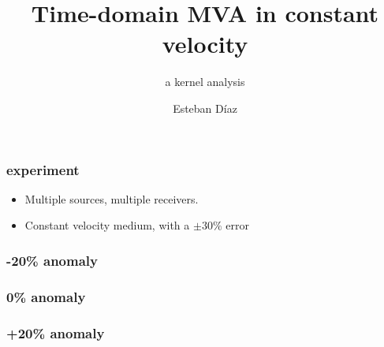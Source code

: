 



\title[]{Time-domain MVA in constant velocity}
\subtitle{a kernel analysis}
\author[]{Esteban  D\'{i}az}
\date{}
\logo{}

\def\big#1{\begin{center} \LARGE \textbf{#1} \end{center}}
\def\cen#1{\begin{center}        \textbf{#1} \end{center}}

 { \cwpcover }

\begin{frame}

\end{frame}


\begin{frame} \frametitle{experiment}
\begin{itemize}

\item Multiple sources, multiple receivers.
\item Constant velocity medium, with a $\pm30\%$ error
\end{itemize}
\end{frame}





\begin{frame}\frametitle{-20\% anomaly}
\end{frame}

\begin{frame}\frametitle{0\% anomaly} 
\end{frame}
\begin{frame}\frametitle{+20\% anomaly} 
\end{frame}







